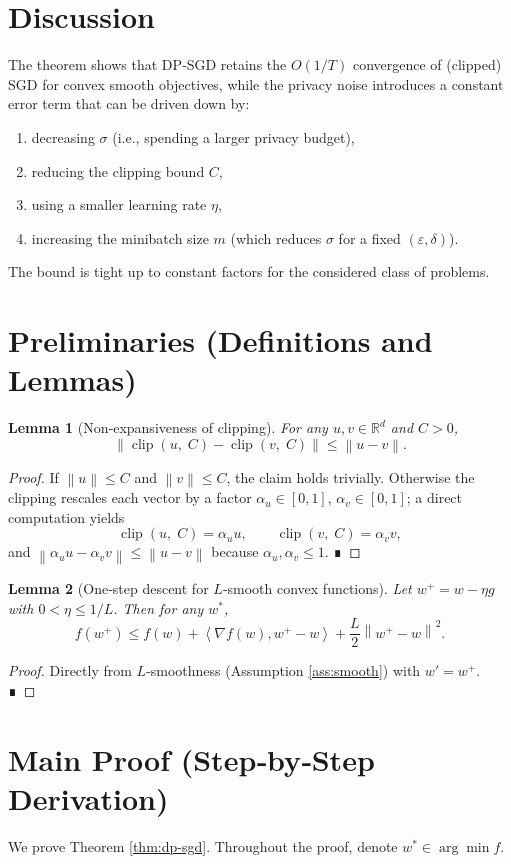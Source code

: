 \documentclass[11pt]{article}
\newtheorem{lemma}{Lemma}
\newcommand{\R}{\mathbb{R}}
\newcommand{\norm}[1]{\left\|#1\right\|}
\newcommand{\inner}[2]{\left\langle #1,#2\right\rangle}
\newcommand{\clip}[2]{\operatorname{clip}\!\left(#1,\;#2\right)}
\begin{document}
\section*{Discussion}
The theorem shows that DP‑SGD retains the $O(1/T)$ convergence of (clipped) SGD for convex smooth objectives, while the privacy noise introduces a constant error term that can be driven down by:
\begin{enumerate}
\item decreasing $\sigma$ (i.e., spending a larger privacy budget),
\item reducing the clipping bound $C$,
\item using a smaller learning rate $\eta$,
\item increasing the minibatch size $m$ (which reduces $\sigma$ for a fixed $(\varepsilon,\delta)$).
\end{enumerate}
The bound is tight up to constant factors for the considered class of problems.

\section*{Preliminaries (Definitions and Lemmas)}
\begin{lemma}[Non‑expansiveness of clipping]\label{lem:clip}
For any $u,v\in\R^{d}$ and $C>0$,
\[
\norm{\clip{u}{C}-\clip{v}{C}}\le \norm{u-v}.
\]
\end{lemma}
\begin{proof}
If $\norm{u}\le C$ and $\norm{v}\le C$, the claim holds trivially. Otherwise the clipping rescales each vector by a factor $\alpha_{u}\in[0,1]$, $\alpha_{v}\in[0,1]$; a direct computation yields
\[
\clip{u}{C}= \alpha_{u}u,\qquad \clip{v}{C}= \alpha_{v}v,
\]
and $\norm{\alpha_{u}u-\alpha_{v}v}\le \norm{u-v}$ because $\alpha_{u},\alpha_{v}\le1$. ∎
\end{proof}
\begin{lemma}[One‑step descent for $L$‑smooth convex functions]\label{lem:descent}
Let $w^{+}=w-\eta g$ with $0<\eta\le 1/L$. Then for any $w^{*}$,
\[
f(w^{+})\le f(w)+\inner{\nabla f(w)}{w^{+}-w}+\frac{L}{2}\norm{w^{+}-w}^{2}.
\]
\end{lemma}
\begin{proof}
Directly from $L$‑smoothness (Assumption \ref{ass:smooth}) with $w'=w^{+}$. ∎
\end{proof}

\section*{Main Proof (Step‑by‑Step Derivation)}
We prove Theorem \ref{thm:dp-sgd}. Throughout the proof, denote $w^{*}\in\arg\min f$.
\end{document}
